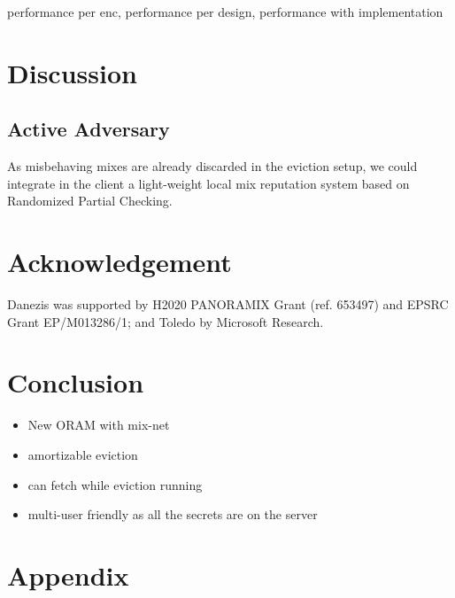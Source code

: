 \documentclass[USenglish,oneside,twocolumn]{article}
\begin{document}
performance per enc, performance per design, performance with implementation


\section{Discussion}\label{Discussion}

\subsection{Active Adversary}\label{Active Adversary}
As misbehaving mixes are already discarded in the eviction setup, we could integrate in the client a light-weight local mix reputation system based on Randomized Partial Checking.


\section{Acknowledgement}
Danezis was supported by H2020  PANORAMIX Grant (ref. 653497) and EPSRC Grant EP/M013286/1; and Toledo by Microsoft Research.


\section{Conclusion}\label{Conclusion}
\begin{itemize}
 \item New ORAM with mix-net
 \item amortizable eviction
 \item can fetch while eviction running
 \item multi-user friendly as all the secrets are on the server
\end{itemize}




\section{Appendix}
\end{document}
